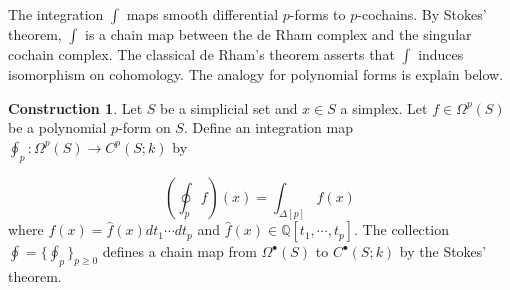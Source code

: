 \documentclass[psamsfonts]{amsart}
\theoremstyle{definition}
\newtheorem{con}{Construction}[section]
\newcommand{\Q}{\mathbb{Q}}
\numberwithin{equation}{section}
\begin{document}
The integration $\int$ maps smooth differential $p$-forms to $p$-cochains. By Stokes' theorem, $\int$ is a chain map between the de Rham complex and the singular cochain complex. The classical de Rham's theorem asserts that $\int$ induces isomorphism on cohomology. The analogy for polynomial forms is explain below.

\begin{con}
Let $S$ be a simplicial set and $x\in S$ a simplex. Let $f\in\Omega^p(S)$ be a polynomial $p$-form on $S$. Define an integration map $\oint_p:\Omega^p(S)\to C^p(S;k)$ by

\[(\oint_pf)(x)=\int_{\Delta[p]}f(x)\]
where $f(x)=\hat{f}(x)dt_1\cdots dt_p$ and $\hat{f}(x)\in\Q[t_1,\cdots,t_p]$. The collection $\oint=\{\oint_p\}_{p\geq0}$ defines a chain map from $\Omega^\bullet(S)$ to $C^\bullet(S;k)$ by the Stokes' theorem.
\end{con}
\end{document}
